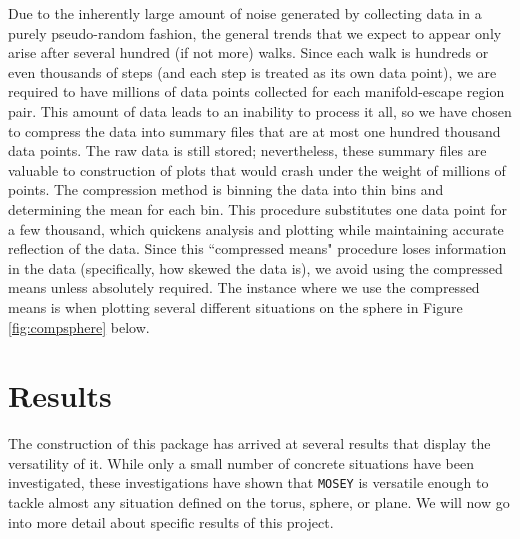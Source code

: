 \documentclass[12pt]{article}
\begin{document}
		Due to the inherently large amount of noise generated by collecting data in a purely pseudo-random fashion, the general trends that we expect to appear only arise after several hundred (if not more) walks.
		Since each walk is hundreds or even thousands of steps (and each step is treated as its own data point), we are required to have millions of data points collected for each manifold-escape region pair.
		This amount of data leads to an inability to process it all, so we have chosen to compress the data into summary files that are at most one hundred thousand data points.
		The raw data is still stored; nevertheless, these summary files are valuable to construction of plots that would crash under the weight of millions of points.
		The compression method is binning the data into thin bins and determining the mean for each bin.
		This procedure substitutes one data point for a few thousand, which quickens analysis and plotting while maintaining accurate reflection of the data.
		Since this ``compressed means" procedure loses information in the data (specifically, how skewed the data is), we avoid using the compressed means unless absolutely required.
		The instance where we use the compressed means is when plotting several different situations on the sphere in Figure \ref{fig:compsphere} below.

\section{Results}
	The construction of this package has arrived at several results that display the versatility of it.
	While only a small number of concrete situations have been investigated, these investigations have shown that \texttt{MOSEY} is versatile enough to tackle almost any situation defined on the torus, sphere, or plane.
	We will now go into more detail about specific results of this project.
	
\end{document}
